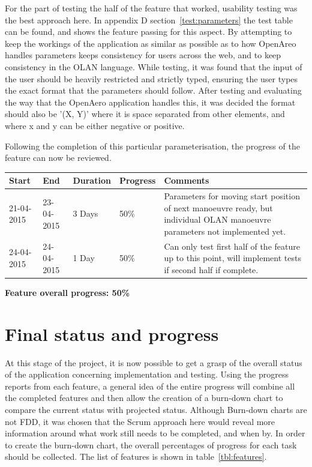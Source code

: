 For the part of testing the half of the feature that worked, usability testing was the best approach here. In appendix D section~\ref{test:parameters} the test table can be found, and shows the feature passing for this aspect. By attempting to keep the workings of the application as similar as possible as to how OpenAreo handles parameters keeps consistency for users across the web, and to keep consistency in the OLAN language. While testing, it was found that the input of the user should be heavily restricted and strictly typed, ensuring the user types the exact format that the parameters should follow. After testing and evaluating the way that the OpenAero application handles this, it was decided the format should also be '(X, Y)' where it is space separated from other elements, and where x and y can be either negative or positive.

Following the completion of this particular parameterisation, the progress of the feature can now be reviewed.

\begin{table}[h]
\begin{tabular}{|l|l|l|l|p{7cm}|}
\hline
\textbf{Start} & \textbf{End} & \textbf{Duration} & \textbf{Progress} & \textbf{Comments}                                                                                                     \\ \hline
21-04-2015     & 23-04-2015   & 3 Days            & 50\%             &  Parameters for moving start position of next manoeuvre ready, but individual OLAN manoeuvre parameters not implemented yet.\\ \hline
24-04-2015     & 24-04-2015   & 1 Day            & 50\%             &  Can only test first half of the feature up to this point, will implement tests if second half if complete.\\ \hline
\end{tabular}
\end{table}

\textbf{Feature overall progress: 50\%}

\clearpage

\section{Final status and progress}
At this stage of the project, it is now possible to get a grasp of the overall status of the application concerning implementation and testing. Using the progress reports from each feature, a general idea of the entire progress will combine all the completed features and then allow the creation of a burn-down chart to compare the current status with projected status. Although Burn-down charts are not FDD, it was chosen that the Scrum approach here would reveal more information around what work still needs to be completed, and when by. In order to create the burn-down chart, the overall percentages of progress for each task should be collected. The list of features is shown in table~\ref{tbl:features}.

